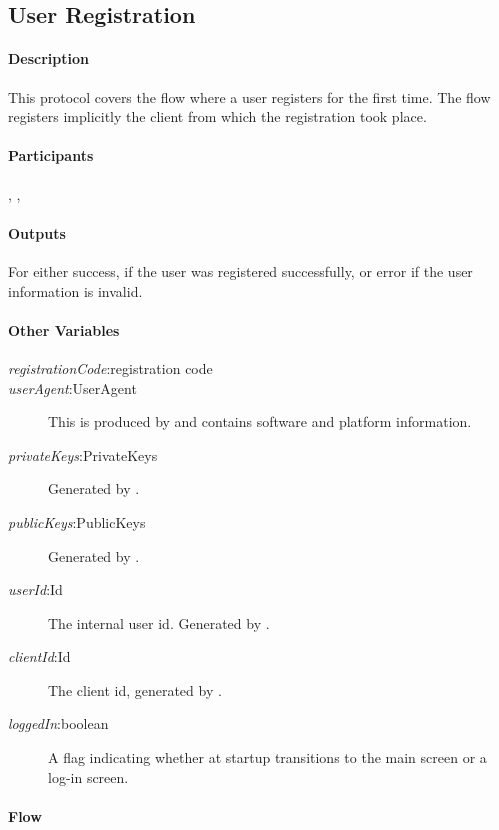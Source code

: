 \documentclass[a4paper,10pt]{article}
\newcommand{\registrationCode}{\emph{registrationCode}}
\newcommand{\userAgent}{\emph{userAgent}}
\newcommand{\privateKeys}{\emph{privateKeys}}
\newcommand{\publicKeys}{\emph{publicKeys}}
\newcommand{\userId}{\emph{userId}}
\newcommand{\clientId}{\emph{clientId}}
\newcommand{\loggedIn}{\emph{loggedIn}}
\begin{document}
\subsection{User Registration}

\paragraph{Description}
This protocol covers the flow where a user registers for the first time. The flow registers implicitly the client from which the registration took place.

\paragraph{Participants} \Server{}, \Client{}, \User{}

\paragraph{Outputs}
For \Client{} either success, if the user was registered successfully, or error if the user information is invalid.

\paragraph{Other Variables}
\SpecialItem
\begin{description}
 \item[\registrationCode{}:registration code]
 \item[\userAgent{}:UserAgent] This is produced by \Client{} and contains software and platform information.
 \item[\privateKeys{}:PrivateKeys] Generated by \Client{}.
 \item[\publicKeys{}:PublicKeys] Generated by \Client{}.
 \item[\userId{}:Id] The internal user id. Generated by \Server{}.
 \item[\clientId{}:Id] The client id, generated by \Server{}.
 \item[\loggedIn{}:boolean] A flag indicating whether at \Client{} startup \Client{} transitions to the main screen or a log-in screen.
\end{description}

\paragraph{Flow}
\end{document}
